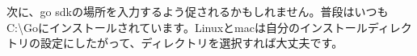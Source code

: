 \begin{enumerate}
\begin{figure}[H]
    \end{figure}
    次に、go sdkの場所を入力するよう促されるかもしれません。普段はいつもC:\textbackslash Goにインストールされています。Linuxとmacは自分のインストールディレクトリの設定にしたがって、ディレクトリを選択すれば大丈夫です。
\end{enumerate}
